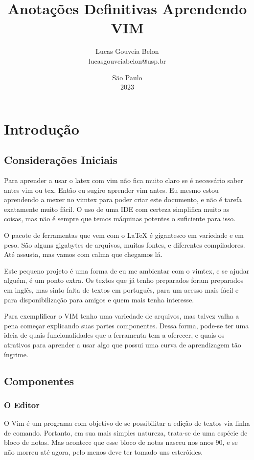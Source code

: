 \documentclass[a4paper, 12pt]{article}
\title{
    \textbf{
    Anotações Definitivas
    }
    \break
    Aprendendo VIM
}
\author{
    Lucas Gouveia Belon
    \\
    lucasgouveiabelon@usp.br
}
\date{\vspace{15cm}São Paulo\\2023}
\begin{document}
\maketitle
\newpage
\tableofcontents
\newpage
\section{Introdução}
\subsection{Considerações Iniciais}

Para aprender a usar o latex com vim não fica muito claro se é necessário saber antes vim ou tex.
Então eu sugiro aprender vim antes.
Eu mesmo estou aprendendo a mexer no vimtex para poder criar este documento, e não é tarefa exatamente muito fácil.
O uso de uma IDE com certeza simplifica muito as coisas, mas não é sempre que temos máquinas potentes o suficiente para isso.

O pacote de ferramentas que vem com o \LaTeX \hspace{0.1cm} é gigantesco em variedade e em peso.
São alguns gigabytes de arquivos, muitas fontes, e diferentes compiladores.
Até assusta, mas vamos com calma que chegamos lá.

Este pequeno projeto é uma forma de eu me ambientar com o vimtex, e se ajudar alguém, é um ponto extra.
Os textos que já tenho preparados foram preparados em inglês, mas sinto falta de textos em português, para um acesso mais fácil e para disponibilização para amigos e quem mais tenha interesse.

Para exemplificar o VIM tenho uma variedade de arquivos, mas talvez valha a pena começar explicando suas partes componentes.
Dessa forma, pode-se ter uma ideia de quais funcionalidades que a ferramenta tem a oferecer, e quais os atrativos para aprender a usar algo que possui uma curva de aprendizagem tão íngrime.


\subsection{Componentes}
\subsubsection{O Editor}
O Vim é um programa com objetivo de se possibilitar a edição de textos via linha de comando.
Portanto, em sua mais simples natureza, trata-se de uma espécie de bloco de notas.
Mas acontece que esse bloco de notas nasceu nos anos 90, e se não morreu até agora, pelo menos deve ter tomado uns esteróides.
\end{document}

